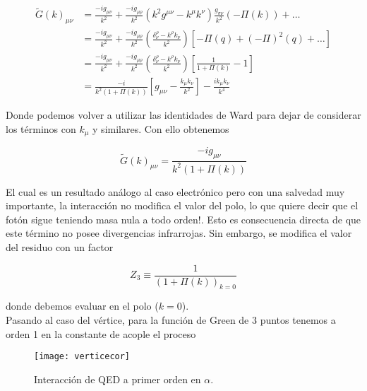 \documentclass[tickz]{article}
\numberwithin{equation}{section}
\begin{document}
\begin{equation}\label{key}
\begin{aligned}
\widetilde{G}(k)_{\mu\nu} &= \frac{-i g_{\mu\nu}}{k^2} + \frac{-i g_{\mu\rho}}{k^2}\left(k^2g^{\mu\nu} - k^{\mu}k^{\nu}\right) \frac{g_{\sigma\nu}}{k^2} \left(-\Pi(k)\right) + \dots\\
&=\frac{-i g_{\mu\nu}}{k^2} + \frac{-i g_{\mu\rho}}{k^2}\left(\frac{\delta^{\rho}_{\nu} - k^{\rho}k_{\nu}}{k^2} \right) \left[ -\Pi(q) + \left(-\Pi\right)^2(q) + \dots \right]\\
&= \frac{-i g_{\mu\nu}}{k^2} + \frac{-i g_{\mu\rho}}{k^2}\left(\frac{\delta^{\rho}_{\nu} - k^{\rho}k_{\nu}}{k^2} \right) \left[\frac{1}{1 + \Pi(k)} -1 \right]\\
&= \frac{-i}{k^2\left(1+\Pi(k)\right)} \left[g_{\mu\nu} - \frac{k_{\mu}k_{\nu}}{k^2}\right] - \frac{ik_{\mu}k_{\nu}}{k^4}
\end{aligned}
\end{equation}

Donde podemos volver a utilizar las identidades de Ward para dejar de considerar los términos con $ k_{\mu} $ y similares. Con ello obtenemos

\begin{equation}\label{key}
\widetilde{G}(k)_{\mu\nu} = \frac{-ig_{\mu\nu}}{k^2\left(1+\Pi(k)\right)}
\end{equation}

El cual es un resultado análogo al caso electrónico pero con una salvedad muy importante, la interacción no modifica el valor del polo, lo que quiere decir que el fotón sigue teniendo masa nula a todo orden!. Esto es consecuencia directa de que este término no posee divergencias infrarrojas. Sin embargo, se modifica el valor del residuo con un factor

\begin{equation}\label{z3}
Z_3 \equiv \frac{1}{\left(1+\Pi(k)\right)_{k=0}}
\end{equation}

donde debemos evaluar en el polo ($ k=0 $).\\

Pasando al caso del vértice, para la función de Green de 3 puntos tenemos a orden 1 en la constante de acople el proceso

\begin{figure}[h]
	\centering
	\texttt{[image: verticecor]}
	\caption{Interacción de QED a primer orden en $ \alpha $.}
	\label{fig_vertexcompleto}
\end{figure}
\end{document}
